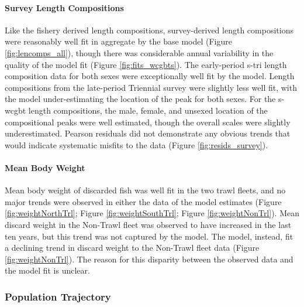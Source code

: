 \documentclass[11pt,
  letterpaper,
]{article}
\begin{document}
\hypertarget{survey-length-compositions}{%
\paragraph{Survey Length Compositions}\label{survey-length-compositions}}

Like the fishery derived length compositions, survey-derived length compositions were reasonably well fit in aggregate by the base model (Figure \ref{fig:lencomps_all}), though there was considerable annual variability in the quality of the model fit (Figure \ref{fig:fits_wcgbts}). The early-period \gls{s-tri} length composition data for both sexes were exceptionally well fit by the model. Length compositions from the late-period Triennial survey were slightly less well fit, with the model under-estimating the location of the peak for both sexes. For the \gls{s-wcgbt} length compositions, the male, female, and unsexed location of the compositional peaks were well estimated, though the overall scales were slightly underestimated. Pearson residuals did not demonstrate any obvious trends that would indicate systematic misfits to the data (Figure \ref{fig:resids_survey}).

\hypertarget{mean-body-weight}{%
\paragraph{Mean Body Weight}\label{mean-body-weight}}

Mean body weight of discarded fish was well fit in the two trawl fleets, and no major trends were observed in either the data of the model estimates (Figure \ref{fig:weightNorthTrl}; Figure \ref{fig:weightSouthTrl}; Figure \ref{fig:weightNonTrl}). Mean discard weight in the Non-Trawl fleet was observed to have increased in the last ten years, but this trend was not captured by the model. The model, instead, fit a declining trend in discard weight to the Non-Trawl fleet data (Figure \ref{fig:weightNonTrl}). The reason for this disparity between the observed data and the model fit is unclear.

\hypertarget{population-trajectory}{%
\subsubsection{Population Trajectory}\label{population-trajectory}}
\end{document}
